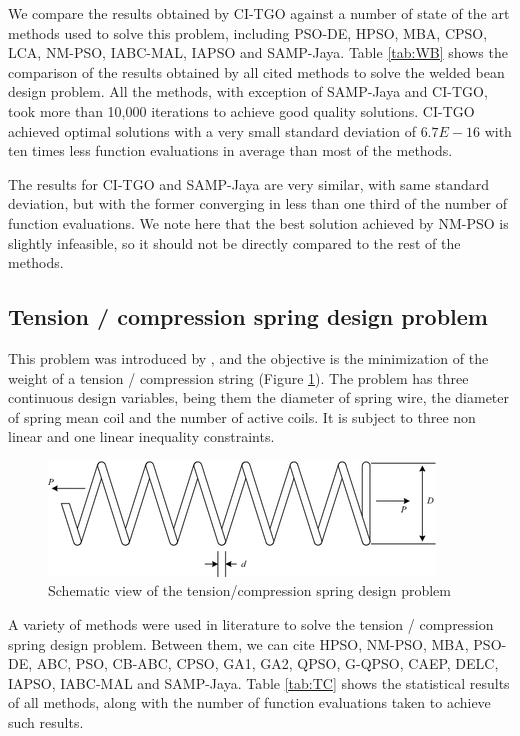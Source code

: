 We compare the results obtained by CI-TGO against a number of state of the art methods used to solve this problem, including PSO-DE, HPSO, MBA, CPSO, LCA, NM-PSO, IABC-MAL, IAPSO and SAMP-Jaya. Table \ref{tab:WB} shows the comparison of the results obtained by all cited methods to solve the welded bean design problem. All the methods, with exception of SAMP-Jaya and CI-TGO, took more than 10,000 iterations to achieve good quality solutions. CI-TGO achieved optimal solutions with a very small standard deviation of $6.7E \!-\! 16$ with ten times less function evaluations in average than most of the methods.



The results for CI-TGO and SAMP-Jaya are very similar, with same standard deviation, but with the former converging in less than one third of the number of function evaluations. We note here that the best solution achieved by NM-PSO is slightly infeasible, so it should not be directly compared to the rest of the methods.




\subsection{Tension / compression spring design problem}

This problem was introduced by \cite{TC}, and the objective is the minimization of the weight of a tension / compression string (Figure \ref{fig:TC}). The problem has three continuous design variables, being them the diameter of spring wire, the diameter of spring mean coil and the number of active coils. It is subject to three non linear and one linear inequality constraints.

\begin{figure}[h]
\begin{center}
\includegraphics[scale=0.6]{Imgs/TC.png}
\end{center}
\captionsetup{justification=centering}
\caption{Schematic view of the tension/compression spring design problem}\label{fig:TC}
\end{figure}


A variety of methods were used in literature to solve the tension / compression spring design problem. Between them, we can cite HPSO, NM-PSO, MBA, PSO-DE, ABC, PSO, CB-ABC, CPSO, GA1, GA2, QPSO, G-QPSO, CAEP, DELC, IAPSO, IABC-MAL and SAMP-Jaya. Table \ref{tab:TC} shows the statistical results of all methods, along with the number of function evaluations taken to achieve such results.

